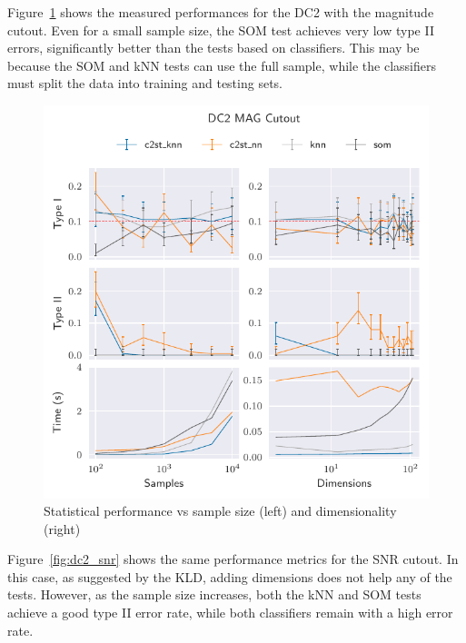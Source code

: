 Figure~\ref{fig:dc2_mag} shows the measured performances for the DC2 with the magnitude
cutout. Even for a small sample size, the \gls{SOM}  test achieves very low type II errors, 
significantly better than the tests based on classifiers.
This may be because the \gls{SOM} and \gls{kNN}
tests can use the full sample, while the classifiers must split the data into training and testing sets.


\begin{figure}[htpb]
    \centering
    \includegraphics{images/6_som/dc2_mag}
    \caption{Statistical performance vs sample size (left) and dimensionality (right)}
    \label{fig:dc2_mag}
\end{figure}

Figure~\ref{fig:dc2_snr} shows the same performance metrics for the \gls{SNR} cutout. In this case,
as suggested by the \gls{KLD}, adding dimensions does not help any of the tests.
However, as the sample size increases, both the \gls{kNN} and \gls{SOM}  tests achieve a good
type II error rate, while both classifiers remain with a high error rate.

